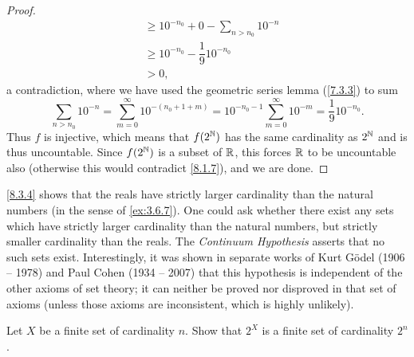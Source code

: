 \begin{proof}
\begin{align*}
      & \geq 10^{-n_0} + 0 - \sum_{n > n_0} 10^{-n}                                                   \\
      & \geq 10^{-n_0} - \dfrac{1}{9} 10^{-n_0}                                                       \\
      & > 0,
  \end{align*}
  a contradiction, where we have used the geometric series lemma (\cref{7.3.3}) to sum
  \[
    \sum_{n > n_0} 10^{-n} = \sum_{m = 0}^\infty 10^{-(n_0 + 1 + m)} = 10^{-n_0 - 1} \sum_{m = 0}^\infty 10^{-m} = \dfrac{1}{9} 10^{-n_0}.
  \]
  Thus \(f\) is injective, which means that \(f(2^{\mathbb{N}})\) has the same cardinality as \(2^{\mathbb{N}}\) and is thus uncountable.
  Since \(f(2^{\mathbb{N}})\) is a subset of \(\mathbb{R}\), this forces \(\mathbb{R}\) to be uncountable also (otherwise this would contradict \cref{8.1.7}), and we are done.
\end{proof}

\setcounter{thm}{5}
\begin{rmk}\label{8.3.6}
  \cref{8.3.4} shows that the reals have strictly larger cardinality than the natural numbers (in the sense of \cref{ex:3.6.7}).
  One could ask whether there exist any sets which have strictly larger cardinality than the natural numbers, but strictly smaller cardinality than the reals.
  The \emph{Continuum Hypothesis} asserts that no such sets exist.
  Interestingly, it was shown in separate works of Kurt Gödel (1906 -- 1978) and Paul Cohen (1934 -- 2007) that this hypothesis is independent of the other axioms of set theory;
  it can neither be proved nor disproved in that set of axioms
  (unless those axioms are inconsistent, which is highly unlikely).
\end{rmk}

\exercisesection

\begin{ex}\label{ex:8.3.1}
  Let \(X\) be a finite set of cardinality \(n\).
  Show that \(2^X\) is a finite set of cardinality \(2^n\).
\end{ex}

